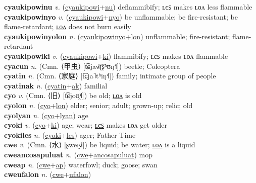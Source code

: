 \textbf{cyaukipowinu} \textit{v.} (\hyperref[cyaukipowi]{cyaukipowi}+\hyperref[nu]{nu})
deflammibify; ʟєꜱ makes ʟᴏᴧ less flammable \label{cyaukipowinu} \\
\textbf{cyaukipowinyo} \textit{v.} (\hyperref[cyaukipowi]{cyaukipowi}+\hyperref[nyo]{nyo})
be unflammable; be fire-resistant; be flame-retardant; \hyperref[cyaukipowinyolon]{ʟᴏᴧ} does not burn easily \label{cyaukipowinyo} \\
\textbf{cyaukipowinyolon} \textit{n.} (\hyperref[cyaukipowinyo]{cyaukipowinyo}+\hyperref[lon]{lon})
unflammable; fire-resistant; flame-retardant \label{cyaukipowinyolon} \\
\textbf{cyaukipowiki} \textit{v.} (\hyperref[cyaukipowi]{cyaukipowi}+\hyperref[ki]{ki})
flammibify; ʟєꜱ makes ʟᴏᴧ flammable \label{cyaukipowiki} \\
\textbf{cyacun} \textit{n.} (Cmn. ⟨甲虫⟩ [t͡ɕja˧˩˧ʈ͡ʂʰʊŋ˧˥])
beetle; Coleoptera \label{cyacun} \\
\textbf{cyatin} \textit{n.} (Cmn. ⟨家庭⟩ [t͡ɕja˥tʰiŋ˧˥])
family; intimate group of people \label{cyatin} \\
\textbf{cyatinak} \textit{n.} (\hyperref[cyatin]{cyatin}+\hyperref[ak]{ak})
familial \label{cyatinak} \\
\textbf{cyo} \textit{v.} (Cmn. ⟨旧⟩ [t͡ɕjoʊ̯˥˩])
be old; \hyperref[cyolon]{ʟᴏᴧ} is old \label{cyo} \\
\textbf{cyolon} \textit{n.} (\hyperref[cyo]{cyo}+\hyperref[lon]{lon})
elder; senior; adult; grown-up; relic; old \label{cyolon} \\
\textbf{cyolyan} \textit{n.} (\hyperref[cyo]{cyo}+\hyperref[lyan]{lyan})
age \label{cyolyan} \\
\textbf{cyoki} \textit{v.} (\hyperref[cyo]{cyo}+\hyperref[ki]{ki})
age; wear; \hyperref[cyokiles]{ʟєꜱ} makes ʟᴏᴧ get older \label{cyoki} \\
\textbf{cyokiles} \textit{n.} (\hyperref[cyoki]{cyoki}+\hyperref[les]{les})
ager; Father Time \label{cyokiles} \\
\textbf{cwe} \textit{v.} (Cmn. ⟨水⟩ [ʂweɪ̯˧˩˧])
be liquid; be water; \hyperref[cwelon]{ʟᴏᴧ} is a liquid \label{cwe} \\
\textbf{cweancosapuluat} \textit{n.} (\hyperref[cwe]{cwe}+\hyperref[ancosapuluat]{ancosapuluat})
mop \label{cweancosapuluat} \\
\textbf{cweap} \textit{n.} (\hyperref[cwe]{cwe}+\hyperref[ap]{ap})
waterfowl; duck; goose; swan \label{cweap} \\
\textbf{cweufalon} \textit{n.} (\hyperref[cwe]{cwe}+\hyperref[ufalon]{ufalon})
